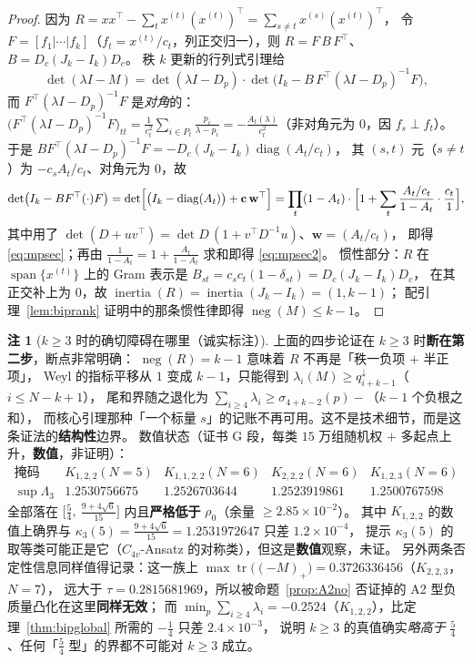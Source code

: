 \documentclass[UTF8,11pt]{ctexart}
\theoremstyle{definition}
\newtheorem{remark}[theorem]{注}
\newcommand{\Lam}{\Lambda}
\newcommand{\tr}{\operatorname{tr}}
\begin{document}
\begin{proof}
因为 $R=xx^\top-\sum_tx^{(t)}(x^{(t)})^\top=\sum_{s\ne t}x^{(s)}(x^{(t)})^\top$，
令 $F=[f_1|\cdots|f_k]$（$f_t=x^{(t)}/c_t$，列正交归一），则 $R=F\,B\,F^\top$、$B=D_c(J_k-I_k)D_c$。
秩 $k$ 更新的行列式引理给
\[
\det(\lambda I-M)=\det(\lambda I-D_p)\cdot\det\bigl(I_k-B\,F^\top(\lambda I-D_p)^{-1}F\bigr),
\]
而 $F^\top(\lambda I-D_p)^{-1}F$ 是\emph{对角}的：
$\bigl(F^\top(\lambda I-D_p)^{-1}F\bigr)_{tt}=\frac1{c_t^2}\sum_{i\in P_t}\frac{p_i}{\lambda-p_i}
=-\frac{A_t(\lambda)}{c_t^2}$（非对角元为 $0$，因 $f_s\perp f_t$）。
于是 $BF^\top(\lambda I-D_p)^{-1}F=-D_c(J_k-I_k)\operatorname{diag}(A_t/c_t)$，
其 $(s,t)$ 元（$s\ne t$）为 $-c_sA_t/c_t$、对角元为 $0$，故
\[
\det\bigl(I_k-BF^\top(\cdot)F\bigr)=\det\Bigl[\bigl(I_k-\operatorname{diag}(A_t)\bigr)+\mathbf c\,\mathbf w^\top\Bigr]
=\prod_t(1-A_t)\cdot\Bigl[1+\sum_t\frac{A_t/c_t}{1-A_t}\cdot\frac{c_t}{1}\Bigr],
\]
其中用了 $\det(D+uv^\top)=\det D\,(1+v^\top D^{-1}u)$、$\mathbf w=(A_t/c_t)$，
即得 \eqref{eq:mpsec}；再由 $\frac1{1-A_t}=1+\frac{A_t}{1-A_t}$ 求和即得 \eqref{eq:mpsec2}。
惯性部分：$R$ 在 $\operatorname{span}\{x^{(t)}\}$ 上的 Gram 表示是 $B_{st}=c_sc_t(1-\delta_{st})=D_c(J_k-I_k)D_c$，
在其正交补上为 $0$，故 $\operatorname{inertia}(R)=\operatorname{inertia}(J_k-I_k)=(1,k-1)$；
配引理~\ref{lem:biprank} 证明中的那条惯性律即得 $\operatorname{neg}(M)\le k-1$。
\end{proof}

\begin{remark}[$k\ge3$ 时的确切障碍在哪里（诚实标注）]\label{rmk:mpopen}
上面的四步论证在 $k\ge3$ 时\textbf{断在第二步}，断点非常明确：
$\operatorname{neg}(R)=k-1$ 意味着 $R$ 不再是「秩一负项 $+$ 半正项」，
Weyl 的指标平移从 $1$ 变成 $k-1$，只能得到 $\lambda_i(M)\ge q^\downarrow_{i+k-1}$（$i\le N-k+1$），
尾和界随之退化为 $\sum_{i\ge4}\lambda_i\ge\sigma_{4+k-2}(p)-$（$k-1$ 个负根之和），
而核心引理那种「一个标量 $s$」的记账不再可用。这不是技术细节，而是这条证法的\textbf{结构性}边界。
数值状态（证书 G 段，每类 $15$ 万组随机权 $+$ 多起点上升，\textbf{数值}，非证明）：
\[
\begin{array}{l|llll}
\text{掩码} & K_{1,2,2}(N{=}5) & K_{1,1,2,2}(N{=}6) & K_{2,2,2}(N{=}6) & K_{1,2,3}(N{=}6)\\
\hline
\sup\Lam_3 & 1.2530756675 & 1.2526703644 & 1.2523919861 & 1.2500767598
\end{array}
\]
全部落在 $\bigl[\frac54,\ \frac{9+4\sqrt6}{15}\bigr]$ 内且\textbf{严格低于} $\rho_0$（余量 $\ge2.85\times10^{-2}$）。
其中 $K_{1,2,2}$ 的数值上确界与 $\kappa_3(5)=\frac{9+4\sqrt6}{15}=1.2531972647$ 只差 $1.2\times10^{-4}$，
提示 $\kappa_3(5)$ 的取等类可能正是它（$C_{4v}$-Ansatz 的对称类），但这是\textbf{数值}观察，未证。
另外两条否定性信息同样值得记录：这一族上 $\max\tr\bigl((-M)_+\bigr)=0.3726336456$（$K_{2,2,3}$，$N=7$），
远大于 $\tau=0.2815681969$，所以被命题~\ref{prop:A2no} 否证掉的 A2 型负质量凸化在这里\textbf{同样无效}；
而 $\min_p\sum_{i\ge4}\lambda_i=-0.2524$（$K_{1,2,2}$），比定理~\ref{thm:bipglobal} 所需的 $-\frac14$ 只差 $2.4\times10^{-3}$，
说明 $k\ge3$ 的真值确实\emph{略高于} $\frac54$、任何「$\frac54$ 型」的界都不可能对 $k\ge3$ 成立。
\end{remark}
\end{document}
